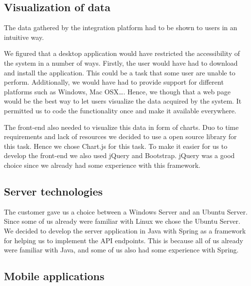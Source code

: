 \subsection{Visualization of data}

The data gathered by the integration platform had to be shown to users in an intuitive way.

We figured that a desktop application would have restricted the accessibility
of the system in a number of ways. Firstly, the user would have had to download
and install the application. This could be a task that some user are unable to perform.
Additionally, we would have had to provide support for different platforms such as
Windows, Mac OSX\ldots.
Hence, we though that a web page would be the best way to let users visualize
the data acquired by the system. It permitted us to code the functionality
once and make it available everywhere.


The front-end also needed to visualize this data in form of charts.
Duo to time requirements and lack of resources we decided to use a open source library for this task.
Hence we chose Chart.js for this task.
To make it easier for us to develop the front-end we also used jQuery and Bootstrap.
jQuery was a good choice since we already had some experience with this framework.

\iffalse
\subsection{Server technologies}

The customer gave us a choice between a Windows Server and an Ubuntu Server.
Since some of us already were familiar with Linux we chose the Ubuntu Server.
We decided to develop the server application in Java with Spring as a framework for helping us to implement the API endpoints.
This is because all of us already were familiar with Java, and some of us also had some experience with Spring.

\subsection{Mobile applications}

